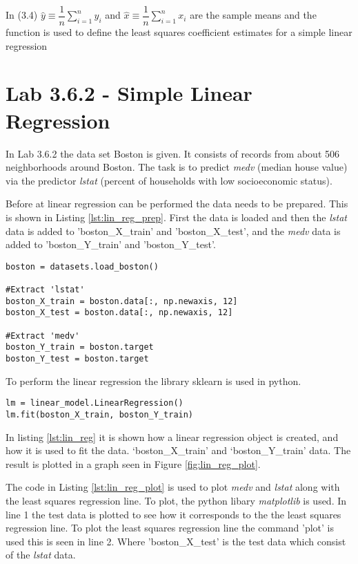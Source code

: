 In (3.4) $\hat{y} \equiv \dfrac{1}{n}\sum\limits_{i=1}^ny_i$ and 
$\hat{x}\equiv \dfrac{1}{n}\sum\limits_{i=1}^nx_i$ are the sample means and the function is used to define the least squares coefficient estimates for a simple linear regression 


\section{Lab 3.6.2 - Simple Linear Regression}


In Lab 3.6.2 the data set Boston is given. It consists of records from about 506 neighborhoods around Boston. The task is to predict \emph{medv} (median house value) via the predictor \emph{lstat} (percent of households with low socioeconomic status).

Before at linear regression can be performed the data needs to be prepared. This is shown in Listing \ref{lst:lin_reg_prep}. First the data is loaded and then the \emph{lstat} data is added to 'boston\_X\_train' and 'boston\_X\_test', and the \emph{medv} data is added to 'boston\_Y\_train' and 'boston\_Y\_test'.

\begin{lstlisting}[caption={Data preparation for linear regression}, label=lst:lin_reg_prep, mathescape=true]
boston = datasets.load_boston()

#Extract 'lstat'
boston_X_train = boston.data[:, np.newaxis, 12]
boston_X_test = boston.data[:, np.newaxis, 12]

#Extract 'medv'
boston_Y_train = boston.target
boston_Y_test = boston.target
\end{lstlisting}

To perform the linear regression the library sklearn is used in python. 

\begin{lstlisting}[caption={Python Linear Regression function}, label=lst:lin_reg, mathescape=true]
lm = linear_model.LinearRegression()
lm.fit(boston_X_train, boston_Y_train)
\end{lstlisting}

In listing \ref{lst:lin_reg} it is shown how a linear regression object is created, and how it is used to fit the data. ‘boston\_X\_train’ and ‘boston\_Y\_train’ data.
The result is plotted in a graph seen in Figure \ref{fig:lin_reg_plot}.


The code in Listing \ref{lst:lin_reg_plot} is used to plot \emph{medv} and \emph{lstat} along with the least squares regression line. To plot, the python libary \emph{matplotlib} is used. In line 1 the test data is plotted to see how it corresponds to the the least squares regression line. To plot the least squares regression line the command 'plot' is used this is seen in line 2. Where 'boston\_X\_test' is the test data which consist of the \emph{lstat} data. 

